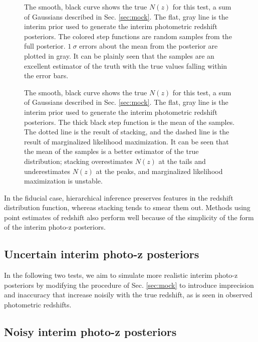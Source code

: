 \documentclass[preprint]{aastex}
\begin{document}
\begin{figure}
\caption{The smooth, black curve shows the true $N(z)$ for this test, a sum of 
Gaussians described in Sec. \ref{sec:mock}.  The flat, gray line is the interim 
prior used to generate the interim photometric redshift posteriors.  The 
colored step functions are random samples from the full posterior.  $1\ \sigma$ 
errors about the mean from the posterior are plotted in gray.  It can be 
plainly seen that the samples are an excellent estimator of the truth with the 
true values falling within the error bars.}
\label{fig:null-samp}
\end{figure}

\begin{figure}
\caption{The smooth, black curve shows the true $N(z)$ for this test, a sum of 
Gaussians described in Sec. \ref{sec:mock}.  The flat, gray line is the interim 
prior used to generate the interim photometric redshift posteriors.  The thick 
black step function is the mean of the samples.  The dotted line is the result 
of stacking, and the dashed line is the result of marginalized likelihood 
maximization.  It can be seen that the mean of the samples is a better 
estimator of the true distribution; stacking overestimates $N(z)$ at the tails 
and underestimates $N(z)$ at the peaks, and marginalized likelihood 
maximization is unstable.}
\label{fig:null-comp}
\end{figure}

In the fiducial case, hierarchical inference preserves features in the redshift 
distribution function, whereas stacking tends to smear them out.  Methods using 
point estimates of redshift also perform well because of the simplicity of the 
form of the interim photo-z posteriors.

\clearpage
\subsection{Uncertain interim photo-z posteriors}
\label{sec:unc}

In the following two tests, we aim to simulate more realistic interim photo-z 
posteriors by modifying the procedure of Sec. \ref{sec:mock} to introduce 
imprecision and inaccuracy that increase noisily with the true redshift, as is 
seen in observed photometric redshifts.

\subsection{Noisy interim photo-z posteriors}
\label{sec:noisy}
\end{document}
